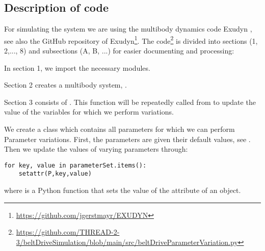 \subsection{Description of code}
For simulating the system we are using the multibody dynamics code Exudyn \cite{Exudyn2023}, see also the GitHub repository of Exudyn\footnote{\url{https://github.com/jgerstmayr/EXUDYN}}.
%
The code\footnote{\url{https://github.com/THREAD-2-3/beltDriveSimulation/blob/main/src/beltDriveParameterVariation.py}} is divided into sections (1, 2,..., 8) and subsections (A, B, ...) for easier documenting and processing: %
\bi 
\item{In section 1, we import the necessary modules.}
\item{Section 2 creates a multibody system, .}
\item{Section 3 consists of . This function will be repeatedly called from  to update the value of the variables for which we perform variations.} 
\bi
\item{
We create a class  which contains all parameters for which we can perform Parameter variations. First, the parameters are given their default values, see . Then we update the values of varying parameters through:
\pythonstyle
\begin{tcolorbox}\begin{lstlisting}
for key, value in parameterSet.items():
    setattr(P,key,value)
\end{lstlisting}\end{tcolorbox}		
where  is a Python function that sets the value of the attribute of an object.}
%
